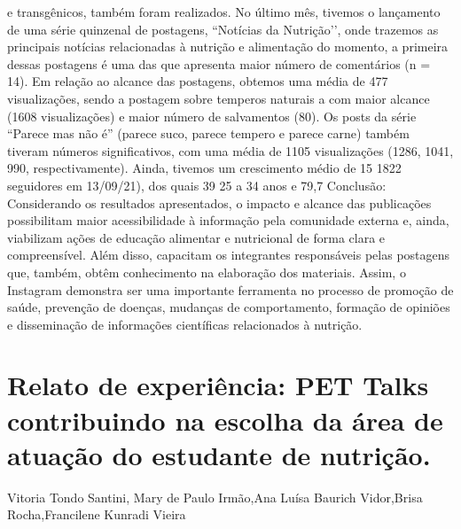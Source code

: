 e transgênicos, também foram realizados. No último mês, tivemos o lançamento de uma série
quinzenal de postagens, “Notícias da Nutrição’’, onde trazemos as principais notícias
relacionadas à nutrição e alimentação do momento, a primeira dessas postagens é uma das que
apresenta maior número de comentários (n = 14). Em relação ao alcance das postagens, obtemos
uma média de 477 visualizações, sendo a postagem sobre temperos naturais a com maior alcance
(1608 visualizações) e maior número de salvamentos (80). Os posts da série “Parece mas não é”
(parece suco, parece tempero e parece carne) também tiveram números significativos, com uma
média de 1105 visualizações (1286, 1041, 990, respectivamente). Ainda, tivemos um
crescimento médio de 15%
1822 seguidores em 13/09/21), dos quais 39%
25 a 34 anos e 79,7%
Conclusão: Considerando os resultados apresentados, o impacto e alcance das publicações
possibilitam maior acessibilidade à informação pela comunidade externa e, ainda, viabilizam
ações de educação alimentar e nutricional de forma clara e compreensível. Além disso,
capacitam os integrantes responsáveis pelas postagens que, também, obtêm conhecimento na
elaboração dos materiais. Assim, o Instagram demonstra ser uma importante ferramenta no
processo de promoção de saúde, prevenção de doenças, mudanças de comportamento, formação
de opiniões e disseminação de informações científicas relacionados à nutrição.



\section{Relato de experiência: PET Talks contribuindo na escolha da área de atuação do estudante de nutrição.}

Vitoria Tondo Santini, Mary de Paulo Irmão,Ana Luísa Baurich Vidor,Brisa Rocha,Francilene Kunradi Vieira


